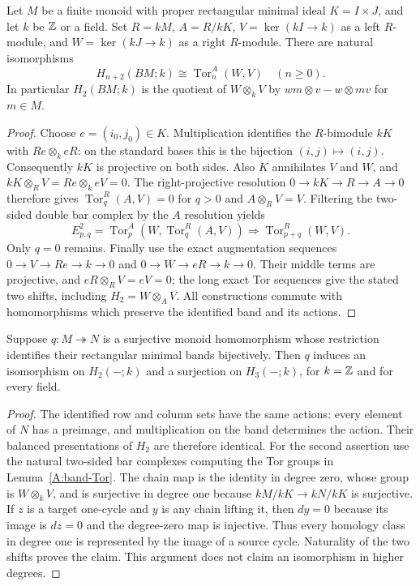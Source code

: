 \begin{lemma}
\label{A:band-Tor}
Let $M$ be a finite monoid with proper rectangular minimal ideal
$K=I\times J$, and let $k$ be $\mathbb{Z}$ or a field. Set
$R=kM$, $A=R/kK$, $V=\ker(kI\to k)$ as a left $R$-module,
and $W=\ker(kJ\to k)$ as a right $R$-module. There are natural
isomorphisms
\[
 H_{n+2}(BM;k)\cong\operatorname{Tor}^{A}_{n}(W,V)
 \quad(n\geq0).
\]
In particular $H_2(BM;k)$ is the quotient of $W\otimes_kV$ by
$wm\otimes v-w\otimes mv$ for $m\in M$.
\end{lemma}
\begin{proof}
Choose $e=(i_0,j_0)\in K$. Multiplication identifies the $R$-bimodule
$kK$ with $Re\otimes_k eR$: on the standard bases this is the
bijection $(i,j)\mapsto(i,j)$. Consequently $kK$ is projective on
both sides. Also $K$ annihilates $V$ and $W$, and
$kK\otimes_R V=Re\otimes_k eV=0$.
The right-projective resolution $0\to kK\to R\to A\to0$
therefore gives $\operatorname{Tor}^R_q(A,V)=0$ for $q>0$ and
$A\otimes_R V=V$. Filtering the two-sided double bar complex by
the $A$ resolution yields
\[
 E^2_{p,q}=\operatorname{Tor}^A_p
   (W,\operatorname{Tor}^R_q(A,V))
 \Longrightarrow\operatorname{Tor}^R_{p+q}(W,V).
\]
Only $q=0$ remains. Finally use the exact augmentation sequences
$0\to V\to Re\to k\to0$ and
$0\to W\to eR\to k\to0$.
Their middle terms are projective, and $eR\otimes_RV=eV=0$;
the long exact Tor sequences give the stated two shifts, including
$H_2=W\otimes_AV$. All constructions commute with homomorphisms
which preserve the identified band and its actions.
\end{proof}

\begin{lemma}
\label{A:band-quotient-H3}
Suppose $q:M\twoheadrightarrow N$ is a surjective monoid
homomorphism whose restriction identifies their rectangular minimal
bands bijectively. Then $q$ induces an isomorphism on $H_2(-;k)$
and a surjection on $H_3(-;k)$, for $k=\mathbb{Z}$ and for every field.
\end{lemma}
\begin{proof}
The identified row and column sets have the same actions: every
element of $N$ has a preimage, and multiplication on the band
determines the action. Their balanced presentations of $H_2$ are
therefore identical. For the second assertion use the natural
two-sided bar complexes computing the Tor groups in
Lemma~\ref{A:band-Tor}. The chain map is the identity in degree
zero, whose group is $W\otimes_kV$, and is surjective in degree
one because $kM/kK\to kN/kK$ is surjective. If $z$ is a target
one-cycle and $y$ is any chain lifting it, then $dy=0$ because
its image is $dz=0$ and the degree-zero map is injective. Thus
every homology class in degree one is represented by the image
of a source cycle. Naturality of the two shifts proves the claim.
This argument does not claim an isomorphism in higher degrees.
\end{proof}

